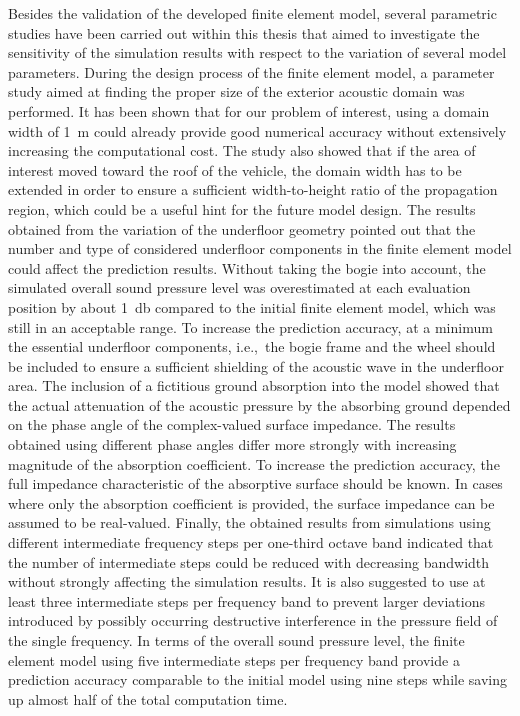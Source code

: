 Besides the validation of the developed finite element model, several parametric studies have been carried out within this thesis that aimed to investigate the sensitivity of the simulation results with respect to the variation of several model parameters.
During the design process of the finite element model, a parameter study aimed at finding the proper size of the exterior acoustic domain was performed. It has been shown that for our problem of interest, using a domain width of \SI{1}{\meter} could already provide good numerical accuracy without extensively increasing the computational cost. The study also showed that if the area of interest moved toward the roof of the vehicle, the domain width has to be extended in order to ensure a sufficient width-to-height ratio of the propagation region, which could be a useful hint for the future model design.
The results obtained from the variation of the underfloor geometry pointed out that the number and type of considered underfloor components in the finite element model could affect the prediction results. Without taking the bogie into account, the simulated overall sound pressure level was overestimated at each evaluation position by about \SI{1}{\decibel} compared to the initial finite element model, which was still in an acceptable range. To increase the prediction accuracy, at a minimum the essential underfloor components, i.e.,\ the bogie frame and the wheel should be included to ensure a sufficient shielding of the acoustic wave in the underfloor area.
The inclusion of a fictitious ground absorption into the model showed that the actual attenuation of the acoustic pressure by the absorbing ground depended on the phase angle of the complex-valued surface impedance. The results obtained using different phase angles differ more strongly with increasing magnitude of the absorption coefficient. To increase the prediction accuracy, the full impedance characteristic of the absorptive surface should be known. In cases where only the absorption coefficient is provided, the surface impedance can be assumed to be real-valued.
Finally, the obtained results from simulations using different intermediate frequency steps per one-third octave band indicated that the number of intermediate steps could be reduced with decreasing bandwidth without strongly affecting the simulation results. It is also suggested to use at least three intermediate steps per frequency band to prevent larger deviations introduced by possibly occurring destructive interference in the pressure field of the single frequency. In terms of the overall sound pressure level, the finite element model using five intermediate steps per frequency band provide a prediction accuracy comparable to the initial model using nine steps while saving up almost half of the total computation time.


